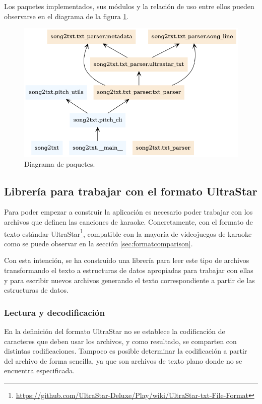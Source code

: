 Los paquetes implementados, sus módulos y la relación de uso entre ellos pueden observarse en el diagrama de la figura \ref{fig:modules1}.


\begin{figure}[h!]
	\includegraphics[width=\linewidth]{logos/packages.png}
	\caption{Diagrama de paquetes.}
	\label{fig:modules1}
\end{figure}


\subsection{Librería para trabajar con el formato UltraStar}
\label{sec:txtparser}

Para poder empezar a construir la aplicación es necesario poder trabajar con los archivos que definen las canciones de karaoke. Concretamente, con el formato de texto estándar UltraStar\footnote{\url{https://github.com/UltraStar-Deluxe/Play/wiki/UltraStar-txt-File-Format}},  compatible con la mayoría de videojuegos de karaoke como se puede observar en la sección \ref{sec:formatcomparison}.

Con esta intención, se ha construido una librería para leer este tipo de archivos transformando el texto a estructuras de datos apropiadas para trabajar con ellas y para escribir nuevos archivos generando el texto correspondiente a partir de las estructuras de datos.

\subsubsection{Lectura y decodificación}

En la definición del formato UltraStar no se establece la codificación de caracteres que deben usar los archivos, y como resultado, se comparten con distintas codificaciones. Tampoco es posible determinar la codificación a partir del archivo de forma sencilla, ya que son archivos de texto plano donde no se encuentra especificada.

